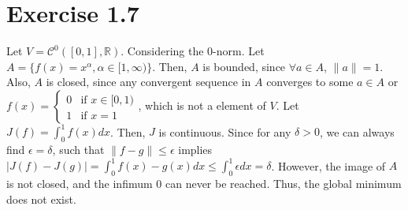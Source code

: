 \documentclass[11pt]{report}
\begin{document}
\section*{Exercise 1.7}
Let $V = \mathcal{C}^0([0,1],\mathbb{R})$. Considering the $0$-norm. Let $A = \{f(x) = x^\alpha, \alpha \in [1, \infty)\}$. Then, $A$ is bounded, since $\forall a \in A$, $\|a\| = 1$. Also, $A$ is closed, since any convergent sequence in $A$ converges to some $a \in A$ or $f(x) = \begin{cases}0 &\mbox{if } x \in [0,1)\\ 1 &\mbox{if } x = 1\end{cases}$, which is not a element of $V$. Let $J(f) = \int_{0}^{1} f(x)dx$. Then, $J$ is continuous. Since for any $\delta > 0$, we can always find $\epsilon = \delta$, such that $\|f-g\| \leq \epsilon$ implies $|J(f) - J(g)| = \int_{0}^{1} f(x) - g(x) dx \leq \int_{0}^{1} \epsilon dx = \delta$. However, the image of $A$ is not closed, and the infimum $0$ can never be reached. Thus, the global minimum does not exist.




\end{document}
